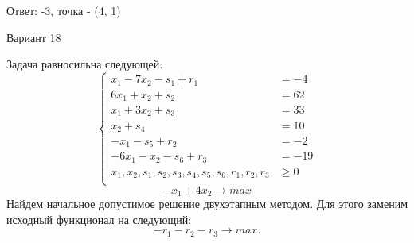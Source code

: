 \documentclass{article}%
\begin{document}
\begin{flushright}%
Ответ: {-}3, точка {-} (4, 1)%
\end{flushright}%
\newpage%
\begin{center}%
\begin{Huge}%
Вариант 18%
\end{Huge}%
\end{center}%
Задача равносильна следующей: %
\[%
\left\{\begin{aligned}x_{1}-7x_{2}-s_{1}+r_{1} & =-4 \\6x_{1}+x_{2}+s_{2} & =62 \\x_{1}+3x_{2}+s_{3} & =33 \\x_{2}+s_{4} & =10 \\-x_{1}-s_{5}+r_{2} & =-2 \\-6x_{1}-x_{2}-s_{6}+r_{3} & =-19 \\x_{1},x_{2},s_{1},s_{2},s_{3},s_{4},s_{5},s_{6},r_{1},r_{2},r_{3} & \ge 0 \\ \end{aligned}\right.%
\]%
\[%
-x_{1}+4x_{2}  \to max%
\]%
Найдем начальное допустимое решение двухэтапным методом. Для этого заменим исходный функционал на следующий: %
\[%
-r_{1}-r_{2}-r_{3}\to max.%
\]%
\end{document}
